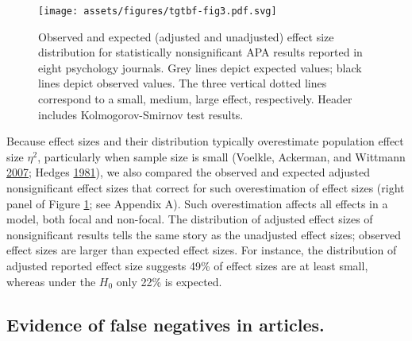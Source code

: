 \documentclass[a5paper]{book}
\begin{document}
\begin{figure}[h]

{\centering \texttt{[image: assets/figures/tgtbf-fig3.pdf.svg]} 

}

\caption{Observed and expected (adjusted and unadjusted) effect size distribution for statistically nonsignificant APA results reported in eight psychology journals. Grey lines depict expected values; black lines depict observed values. The three vertical dotted lines correspond to a small, medium, large effect, respectively. Header includes Kolmogorov-Smirnov test results.}\label{fig:tgtbf-fig3}
\end{figure}

Because effect sizes and their distribution typically overestimate
population effect size \(\eta^2\), particularly when sample size is
small (Voelkle, Ackerman, and Wittmann
\protect\hyperlink{ref-doi:10.1027ux2f1614-2241.3.1.35}{2007}; Hedges
\protect\hyperlink{ref-doi:10.3102ux2f10769986006002107}{1981}), we also
compared the observed and expected adjusted nonsignificant effect sizes
that correct for such overestimation of effect sizes (right panel of
Figure \ref{fig:tgtbf-fig3}; see Appendix A). Such overestimation
affects all effects in a model, both focal and non-focal. The
distribution of adjusted effect sizes of nonsignificant results tells
the same story as the unadjusted effect sizes; observed effect sizes are
larger than expected effect sizes. For instance, the distribution of
adjusted reported effect size suggests 49\% of effect sizes are at least
small, whereas under the \(H_0\) only 22\% is expected.

\subsection{Evidence of false negatives in
articles.}\label{evidence-of-false-negatives-in-articles.}
\end{document}

